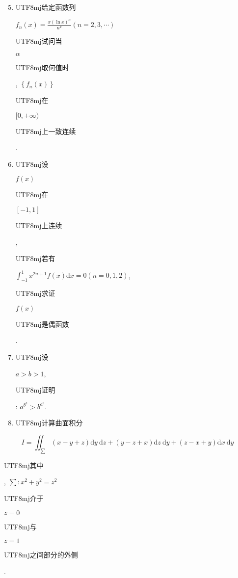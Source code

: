 \documentclass[10pt]{article}
\begin{document}
\begin{enumerate}
  \setcounter{enumi}{4}
  \item \begin{CJK}{UTF8}{mj}给定函数列\end{CJK} $f_{n}(x)=\frac{x(\ln x)^{\alpha}}{n^{x}}(n=2,3, \cdots)$ \begin{CJK}{UTF8}{mj}试问当\end{CJK} $\alpha$ \begin{CJK}{UTF8}{mj}取何值时\end{CJK}, $\left\{f_{n}(x)\right\}$ \begin{CJK}{UTF8}{mj}在\end{CJK} $[0,+\infty)$ \begin{CJK}{UTF8}{mj}上一致连续\end{CJK}.

  \item \begin{CJK}{UTF8}{mj}设\end{CJK} $f(x)$ \begin{CJK}{UTF8}{mj}在\end{CJK} $[-1,1]$ \begin{CJK}{UTF8}{mj}上连续\end{CJK}, \begin{CJK}{UTF8}{mj}若有\end{CJK} $\int_{-1}^{1} x^{2 n+1} f(x) \mathrm{d} x=0(n=0,1,2)$, \begin{CJK}{UTF8}{mj}求证\end{CJK} $f(x)$ \begin{CJK}{UTF8}{mj}是偶函数\end{CJK}.

  \item \begin{CJK}{UTF8}{mj}设\end{CJK} $a>b>1$, \begin{CJK}{UTF8}{mj}证明\end{CJK}: $a^{b^{a}}>b^{a^{b}}$.

  \item \begin{CJK}{UTF8}{mj}计算曲面积分\end{CJK}

\end{enumerate}
$$
I=\iint_{\sum}(x-y+z) \mathrm{d} y \mathrm{~d} z+(y-z+x) \mathrm{d} z \mathrm{~d} y+(z-x+y) \mathrm{d} x \mathrm{~d} y
$$
\begin{CJK}{UTF8}{mj}其中\end{CJK}, $\sum: x^{2}+y^{2}=z^{2}$ \begin{CJK}{UTF8}{mj}介于\end{CJK} $z=0$ \begin{CJK}{UTF8}{mj}与\end{CJK} $z=1$ \begin{CJK}{UTF8}{mj}之间部分的外侧\end{CJK}.
\end{document}
